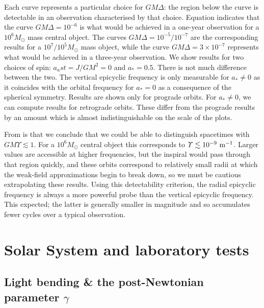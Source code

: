 Each curve represents a particular choice for $GM\Delta$: the region below the curve is detectable in an observation characterised by that choice. Equation  indicates that the curve $GM\Delta = 10^{-6}$ is what would be achieved in a one-year observation for a $10^6 M_\odot$ mass central object. The curves $GM\Delta = 10^{-5}/10^{-7}$ are the corresponding results for a $10^7/10^5M_\odot$ mass object, while the curve $GM\Delta = 3 \times 10^{-7}$ represents what would be achieved in a three-year observation. We show results for two choices of spin: $a_ast = J/GM^2 = 0$ and $a_\ast = 0.5$. There is not much difference between the two. The vertical epicyclic frequency is only measurable for $a_\ast \neq 0$ as it coincides with the orbital frequency for $a_\ast = 0$ as a consequence of the spherical symmetry. Results are shown only for prograde orbits. For $a_\ast \neq 0$, we can compute results for retrograde orbits. These differ from the prograde results by an amount which is almost indistinguishable on the scale of the plots.

From  is that we conclude that we could be able to distinguish spacetimes with $GM\Upsilon \lesssim 1 $. For a $10^6 M_\odot$ central object this corresponds to $\Upsilon \lesssim 10^{-9}~\mathrm{m^{-1}}$. Larger values are accessible at higher frequencies, but the inspiral would pass through that region quickly, and these orbits correspond to relatively small radii at which the weak-field approximations begin to break down, so we must be cautious extrapolating these results. Using this detectability criterion, the radial epicyclic frequency is always a more powerful probe than the vertical epicyclic frequency. This expected; the latter is generally smaller in magnitude and so accumulates fewer cycles over a typical observation.

\section{Solar System and laboratory tests\label{sec:Tests}}

\subsection{Light bending \& the post-Newtonian parameter $\gamma$}

